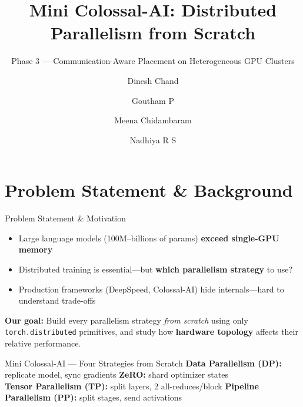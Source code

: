 \documentclass[10pt, aspectratio=169]{beamer}
\title{Mini Colossal-AI: Distributed Parallelism from Scratch}
\subtitle{Phase 3 --- Communication-Aware Placement on Heterogeneous GPU Clusters}
\date{}
\author{Dinesh Chand \and Goutham P \and Meena Chidambaram \and Nadhiya R S}
\institute{MTech-AI, IISc Bangalore}
\begin{document}
\begin{frame}
  \titlepage
\end{frame}

\section{Problem Statement \& Background}

\begin{frame}{Problem Statement \& Motivation}
  \begin{itemize}
    \item Large language models (100M--billions of params) \textbf{exceed single-GPU memory}
    \item Distributed training is essential---but \textbf{which parallelism strategy} to use?
    \item Production frameworks (DeepSpeed, Colossal-AI) hide internals---hard to understand trade-offs
  \end{itemize}

  \vspace{0.8em}
  \textbf{Our goal:} Build every parallelism strategy \emph{from scratch} using only \texttt{torch.distributed} primitives, and study how \textbf{hardware topology} affects their relative performance.

  \vspace{0.5em}
  \begin{block}{Mini Colossal-AI --- Four Strategies from Scratch}
    \small
    \textbf{Data Parallelism (DP):} replicate model, sync gradients \quad
    \textbf{ZeRO:} shard optimizer states \\
    \textbf{Tensor Parallelism (TP):} split layers, 2 all-reduces/block \quad
    \textbf{Pipeline Parallelism (PP):} split stages, send activations
  \end{block}
\end{frame}
\end{document}
